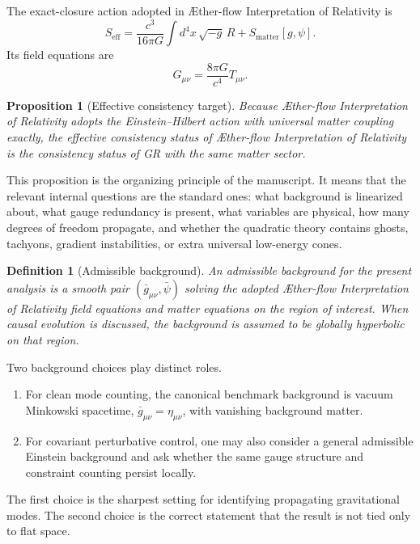 \documentclass[11pt]{article}
\newcommand{\Aflow}{\AE{}ther-flow}
\newcommand{\TheoryName}{\Aflow{} Interpretation of Relativity}
\newtheorem{definition}{Definition}
\newtheorem{proposition}{Proposition}
\begin{document}
The exact-closure action adopted in \TheoryName{} is
\begin{equation}
S_{\mathrm{eff}}
=
\frac{c^3}{16\pi G}\int d^4x\,\sqrt{-g}\,R
+
S_{\mathrm{matter}}[g,\psi].
\label{eq:SA}
\end{equation}
Its field equations are
\begin{equation}
G_{\mu\nu}
=
\frac{8\pi G}{c^4}T_{\mu\nu}.
\label{eq:einstein}
\end{equation}

\begin{proposition}[Effective consistency target]
Because \TheoryName{} adopts the Einstein--Hilbert action with universal matter coupling exactly, the effective consistency status of \TheoryName{} is the consistency status of GR with the same matter sector.
\end{proposition}

This proposition is the organizing principle of the manuscript. It means that the relevant internal questions are the standard ones: what background is linearized about, what gauge redundancy is present, what variables are physical, how many degrees of freedom propagate, and whether the quadratic theory contains ghosts, tachyons, gradient instabilities, or extra universal low-energy cones.

\begin{definition}[Admissible background]
An admissible background for the present analysis is a smooth pair \((\bar g_{\mu\nu},\bar\psi)\) solving the adopted \TheoryName{} field equations and matter equations on the region of interest. When causal evolution is discussed, the background is assumed to be globally hyperbolic on that region.
\end{definition}

Two background choices play distinct roles.
\begin{enumerate}
    \item For clean mode counting, the canonical benchmark background is vacuum Minkowski spacetime, \(\bar g_{\mu\nu}=\eta_{\mu\nu}\), with vanishing background matter.
    \item For covariant perturbative control, one may also consider a general admissible Einstein background and ask whether the same gauge structure and constraint counting persist locally.
\end{enumerate}

The first choice is the sharpest setting for identifying propagating gravitational modes. The second choice is the correct statement that the result is not tied only to flat space.
\end{document}
